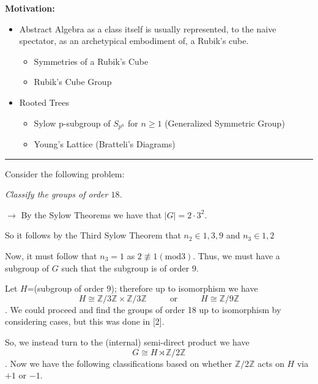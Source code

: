 \documentclass[12pt, letterpaper]{report}
\newcounter{proc}[section] \setcounter{proc}{0}
\theoremstyle{definition}
\theoremstyle{definition}
\theoremstyle{definition}
\theoremstyle{definition}
\theoremstyle{definition}
\theoremstyle{theorem}
\theoremstyle{theorem}
\theoremstyle{remark}
\begin{document}
\begin{center}
\end{center}

\noindent \textbf{Motivation:}
\begin{itemize}
	\item Abstract Algebra as a class itself is usually represented, to the naive spectator, as an archetypical embodiment of, a Rubik's cube. 
		\begin{itemize}
			\item Symmetries of a Rubik's Cube
			\item Rubik's Cube Group
		\end{itemize}
	
	\item Rooted Trees
		\begin{itemize}
			\item Sylow p-subgroup of $S_{p^n}$ for $n\geq 1$ (Generalized Symmetric Group)
			\item Young's Lattice (Bratteli's Diagrams)
		\end{itemize}

\end{itemize}

{ \rule{\textwidth}{3pt}
}
\noindent Consider the following problem:
\begin{center}
	\emph{Classify the groups of order $18$.}
\end{center}

$\to$ By the Sylow Theorems we have that $|G|=2\cdot 3^2$. 

So it follows by the Third Sylow Theorem that $n_2 \in {1,3,9}$ and $n_3\in {1,2}$

Now, it must follow that $n_3=1$ as $2 \not\equiv 1 (\mbox{mod} 3)$. Thus, we must have a subgroup of $G$ such that the subgroup is of order 9.

Let $H$=(subgroup of order $9$); therefore up to isomorphism we have $$H \cong \mathbb{Z/}3\mathbb{Z} \times \mathbb{Z/}3\mathbb{Z} \hspace{1cm} \mbox{ or } \hspace{1cm} H\cong \mathbb{Z/}9\mathbb{Z}$$.
We could proceed and find the groups of order 18 up to isomorphism by considering cases, but this was done in [2]. 

So, we instead turn to the (internal) semi-direct product we have $$G \cong H \rtimes \mathbb{Z/}2\mathbb{Z}$$.
Now we have the following classifications based on whether $\mathbb{Z/}2\mathbb{Z}$ acts on $H$ via ${+1}$ or ${-1}$.
\end{document}
